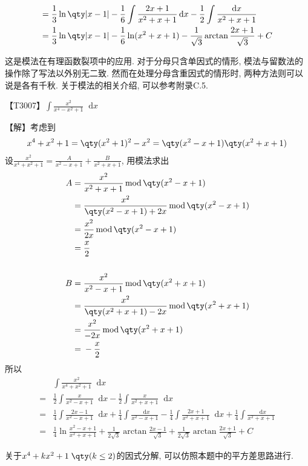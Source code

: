 \documentclass{ctexbook}
\newcommand*{\dif}{\mathop{}\!\mathrm{d}}
\newcommand{\m}{\,\mathrm{mod}\,}
\begin{document}
{\begin{align*}
={}&\frac{1}{3}\ln\qty|x-1|-\frac{1}{6}\int\frac{2x+1}{x^{2}+x+1}\dif{x}-\frac{1}{2}\int\frac{\dif{x}}{x^{2}+x+1}\\
={}&\frac{1}{3}\ln\qty|x-1|-\frac{1}{6}\ln(x^{2}+x+1)-\frac{1}{\sqrt{3}}\arctan{\frac{2x+1}{\sqrt{3}}}+C
\end{align*}\par
{\kaishu 这是模法在有理函数裂项中的应用. 对于分母只含单因式的情形, 模法与留数法的操作除了写法以外别无二致. 然而在处理分母含重因式的情形时, 两种方法则可以说是各有千秋. 关于模法的相关介绍, 可以参考附录C.5. \par}
【T3007】$\int\frac{x^{2}}{x^{4}-x^{2}+1}\dif{x}$\par
【解】考虑到
\begin{align*}
x^{4}+x^{2}+1=\qty(x^{2}+1)^{2}-x^{2}=\qty(x^{2}-x+1)\qty(x^{2}+x+1)
\end{align*}
设$\frac{x^{2}}{x^{4}+x^{2}+1}=\frac{A}{x^{2}-x+1}+\frac{B}{x^{2}+x+1}$, 用模法求出
\begin{align*}
A={}&\frac{x^{2}}{x^{2}+x+1}\m\qty(x^{2}-x+1)\\
={}&\frac{x^{2}}{\qty(x^{2}-x+1)+2x}\m\qty(x^{2}-x+1)\\
={}&\frac{x^{2}}{2x}\m\qty(x^{2}-x+1)\\
={}&\frac{x}{2}\\
\\
B={}&\frac{x^{2}}{x^{2}-x+1}\m\qty(x^{2}+x+1)\\
={}&\frac{x^{2}}{\qty(x^{2}+x+1)-2x}\m\qty(x^{2}+x+1)\\
={}&\frac{x^{2}}{-2x}\m\qty(x^{2}+x+1)\\
={}&-\frac{x}{2}
\end{align*}
所以
\begin{align*}
{}&\int\frac{x^{2}}{x^{4}+x^{2}+1}\dif{x}\\
={}&\frac{1}{2}\int\frac{x}{x^{2}-x+1}\dif{x}-\frac{1}{2}\int\frac{x}{x^{2}+x+1}\dif{x}\\
={}&\frac{1}{4}\int\frac{2x-1}{x^{2}-x+1}\dif{x}+\frac{1}{4}\int\frac{\dif{x}}{x^{2}-x+1}-\frac{1}{4}\int\frac{2x+1}{x^{2}+x+1}\dif{x}+\frac{1}{4}\int\frac{\dif{x}}{x^{2}+x+1}\\
={}&\frac{1}{4}\ln{\frac{x^{2}-x+1}{x^{2}+x+1}}+\frac{1}{2\sqrt{3}}\arctan{\frac{2x-1}{\sqrt{3}}}+\frac{1}{2\sqrt{3}}\arctan{\frac{2x+1}{\sqrt{3}}}+C
\end{align*}\par
{\kaishu 关于$x^{4}+kx^{2}+1\;\qty(k\le2)$的因式分解, 可以仿照本题中的平方差思路进行. \par}
}
\end{document}
